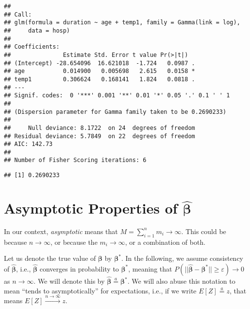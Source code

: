 \documentclass[
  12pt,
]{book}
\newenvironment{Shaded}{\begin{snugshade}}{\end{snugshade}}
\newcommand{\CommentTok}[1]{\textcolor[rgb]{0.56,0.35,0.01}{\textit{#1}}}
\newcommand{\DecValTok}[1]{\textcolor[rgb]{0.00,0.00,0.81}{#1}}
\newcommand{\FunctionTok}[1]{\textcolor[rgb]{0.13,0.29,0.53}{\textbf{#1}}}
\newcommand{\NormalTok}[1]{#1}
\newcommand{\SpecialCharTok}[1]{\textcolor[rgb]{0.81,0.36,0.00}{\textbf{#1}}}
\begin{document}
\begin{verbatim}
## 
## Call:
## glm(formula = duration ~ age + temp1, family = Gamma(link = log), 
##     data = hosp)
## 
## Coefficients:
##               Estimate Std. Error t value Pr(>|t|)  
## (Intercept) -28.654096  16.621018  -1.724   0.0987 .
## age           0.014900   0.005698   2.615   0.0158 *
## temp1         0.306624   0.168141   1.824   0.0818 .
## ---
## Signif. codes:  0 '***' 0.001 '**' 0.01 '*' 0.05 '.' 0.1 ' ' 1
## 
## (Dispersion parameter for Gamma family taken to be 0.2690233)
## 
##     Null deviance: 8.1722  on 24  degrees of freedom
## Residual deviance: 5.7849  on 22  degrees of freedom
## AIC: 142.73
## 
## Number of Fisher Scoring iterations: 6
\end{verbatim}

\begin{Shaded}
\end{Shaded}

\begin{verbatim}
## [1] 0.2690233
\end{verbatim}

\section{\texorpdfstring{Asymptotic Properties of \(\hat{\boldsymbol{\beta}}\)}{Asymptotic Properties of \textbackslash hat\{\textbackslash boldsymbol\{\textbackslash beta\}\}}}\label{asymptotic}

In our context, \emph{asymptotic} means that \(M = \sum_{i = 1}^{n} m_{i}\rightarrow \infty\). This could be because \(n\rightarrow \infty\), or because the \(m_{i}\rightarrow\infty\), or a combination of both.

Let us denote the true value of \(\boldsymbol{\beta}\) by \(\boldsymbol{\beta}^*\). In the following, we assume consistency of \(\hat{\boldsymbol{\beta}}\), i.e., \(\hat{\boldsymbol{\beta}}\) converges in probability to \(\boldsymbol{\beta}^*\), meaning that \(P(||\hat{\boldsymbol{\beta}}- \boldsymbol{\beta}^*|| \geq \varepsilon) \rightarrow 0\) as \(n \rightarrow \infty\). We will denote this by \(\hat{\boldsymbol{\beta}}\stackrel{a}{=} \boldsymbol{\beta}^*\). We will also abuse this notation to mean ``tends to asymptotically'' for expectations, i.e., if we write \(E[Z] \stackrel{a}{=} z\), that means \(E[Z] \stackrel{n \rightarrow \infty}{\longrightarrow} z\).
\end{document}
